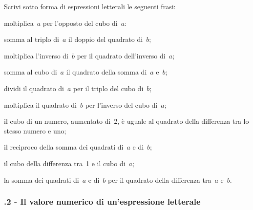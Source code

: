 \begin{multicols}{2}
\begin{esercizio}
\label{ese:8.12}
Scrivi sotto forma di espressioni letterali le seguenti frasi:
 \begin{enumeratea}
 \item moltiplica~$a$ per l'opposto del cubo di~$a$:
 \item somma al triplo di~$a$ il doppio del quadrato di~$b$;
 \item moltiplica l'inverso di~$b$ per il quadrato dell'inverso di~$a$;
 \item somma al cubo di~$a$ il quadrato della somma di~$a$ e~$b$;
 \item dividi il quadrato di~$a$ per il triplo del cubo di~$b$;
 \item moltiplica il quadrato di~$b$ per l'inverso del cubo di~$a$;
 \item il cubo di un numero, aumentato di~2, è uguale al quadrato della differenza tra lo stesso numero e uno;
 \item il reciproco della somma dei quadrati di~$a$ e di~$b$;
 \item il cubo della differenza tra~1 e il cubo di~$a$;
 \item la somma dei quadrati di~$a$ e di~$b$ per il quadrato della differenza tra~$a$ e~$b$.
 \end{enumeratea}
\end{esercizio}
\end{multicols}
\subsubsection*{\thechapter.2 - Il valore numerico di un'espressione letterale}

